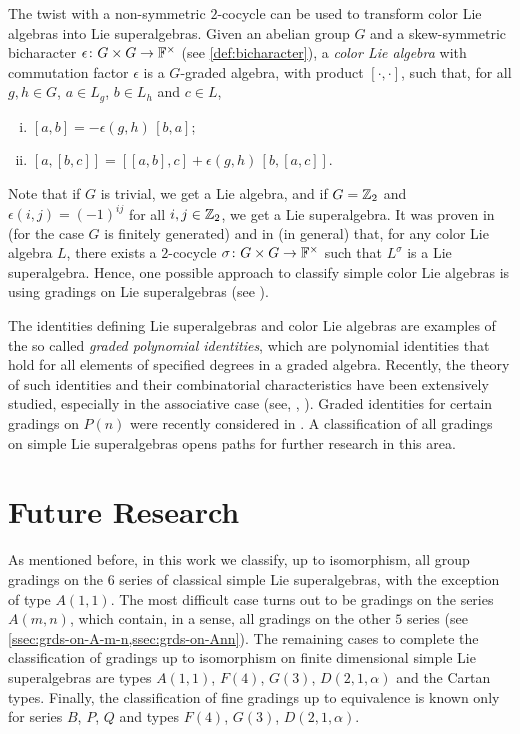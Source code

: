 
The twist with a non-symmetric $2$-cocycle can be used to transform color Lie algebras into Lie superalgebras. 
Given an abelian group $G$ and a skew-symmetric bicharacter $\epsilon\colon G\times G \to \mathbb{F}^\times$ (see \cref{def:bicharacter}), a \emph{color Lie algebra} with commutation factor $\epsilon$ is a $G$-graded algebra, with product $[\cdot, \cdot]$, such that, for all $g, h \in G$, $a \in L_g$, $b \in L_h$ and $c \in L$,
\begin{enumerate}[(i)]
    \item $[a, b] 
    = -\epsilon(g, h)\,[b,a]$;
    \item $[a, [b, c]] 
    = [[a,b],c] + \epsilon(g, h)\,[b,[a,c]]$.
\end{enumerate}
%
Note that if $G$ is trivial, we get a Lie algebra, and if $G = \mathbb{Z}_2$ and $\epsilon(i,j) = (-1)^{ij}$ for all $i,j \in \mathbb{Z}_2$, we get a Lie superalgebra. 
It was proven in \cite{MR529734} (for the case $G$ is finitely generated) and in \cite{MR1600092} (in general) that, for any color Lie algebra $L$, there exists a $2$-cocycle $\sigma\colon G\times G \to \mathbb{F}^\times$ such that $L^\sigma$ is a Lie superalgebra. 
Hence, one possible approach to classify simple color Lie algebras is using gradings on Lie superalgebras (see \cite{MR2497949}).


The identities defining Lie superalgebras and color Lie algebras are examples of the so called \emph{graded polynomial identities}, which are polynomial identities that hold for all elements of specified degrees in a graded algebra. 
Recently, the theory of such identities and their combinatorial characteristics have been extensively studied, especially in the associative case (see, \eg, \cite{MR1935223,MR2176105,MR2680170,MR2639274,MR3068959,MR3030542,MR3152711,MR3271263,MR3773068,MR3920905,MR3886336}). 
Graded identities for certain gradings on $P(n)$ were recently considered in \cite{MR3611462}. 
A classification of all gradings on simple Lie superalgebras opens paths for further research in this area. 


\section{Future Research}

As mentioned before, in this work we classify, up to isomorphism, all group gradings on the $6$ series of classical simple Lie superalgebras, with the exception of type $A(1,1)$. 
The most difficult case turns out to be gradings on the series $A(m,n)$, which contain, in a sense, all gradings on the other $5$ series (see \cref{ssec:grds-on-A-m-n,ssec:grds-on-Ann}). 
The remaining cases to complete the classification of gradings up to isomorphism on finite dimensional simple Lie superalgebras are types $A(1,1)$, $F(4)$, $G(3)$, $D(2,1, \alpha)$ and the Cartan types. 
Finally, the classification of fine gradings up to equivalence is known only for series $B$, $P$, $Q$ and types $F(4)$, $G(3)$, $D(2,1, \alpha)$. 
